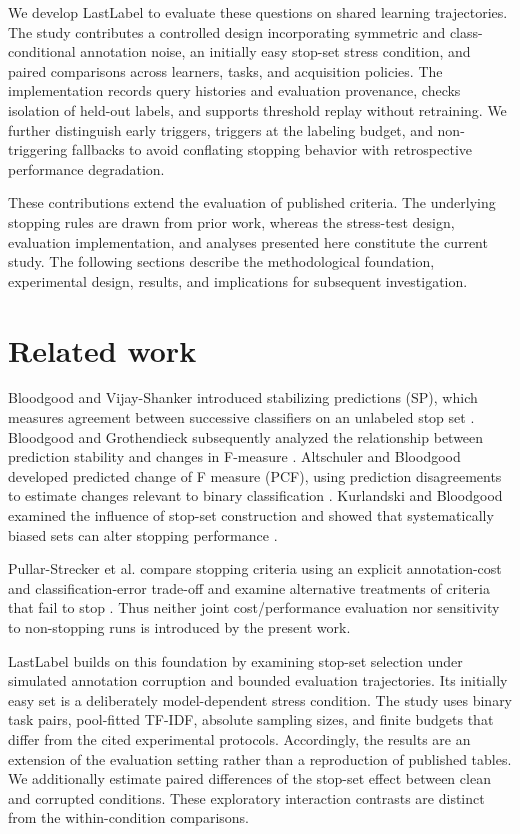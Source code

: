\documentclass[10pt,twocolumn]{article}
\begin{document}
We develop LastLabel to evaluate these questions on shared learning trajectories. The study contributes a controlled design incorporating symmetric and class-conditional annotation noise, an initially easy stop-set stress condition, and paired comparisons across learners, tasks, and acquisition policies. The implementation records query histories and evaluation provenance, checks isolation of held-out labels, and supports threshold replay without retraining. We further distinguish early triggers, triggers at the labeling budget, and non-triggering fallbacks to avoid conflating stopping behavior with retrospective performance degradation.

These contributions extend the evaluation of published criteria. The underlying stopping rules are drawn from prior work, whereas the stress-test design, evaluation implementation, and analyses presented here constitute the current study. The following sections describe the methodological foundation, experimental design, results, and implications for subsequent investigation.

\section{Related work}
Bloodgood and Vijay-Shanker introduced stabilizing predictions (SP), which measures agreement between successive classifiers on an unlabeled stop set \cite{sp}. Bloodgood and Grothendieck subsequently analyzed the relationship between prediction stability and changes in F-measure \cite{analysis}. Altschuler and Bloodgood developed predicted change of F measure (PCF), using prediction disagreements to estimate changes relevant to binary classification \cite{pcf}. Kurlandski and Bloodgood examined the influence of stop-set construction and showed that systematically biased sets can alter stopping performance \cite{stopsets}.

Pullar-Strecker et al. compare stopping criteria using an explicit annotation-cost and classification-error trade-off and examine alternative treatments of criteria that fail to stop \cite{cost}. Thus neither joint cost/performance evaluation nor sensitivity to non-stopping runs is introduced by the present work.

LastLabel builds on this foundation by examining stop-set selection under simulated annotation corruption and bounded evaluation trajectories. Its initially easy set is a deliberately model-dependent stress condition. The study uses binary task pairs, pool-fitted TF-IDF, absolute sampling sizes, and finite budgets that differ from the cited experimental protocols. Accordingly, the results are an extension of the evaluation setting rather than a reproduction of published tables. We additionally estimate paired differences of the stop-set effect between clean and corrupted conditions. These exploratory interaction contrasts are distinct from the within-condition comparisons.
\end{document}
